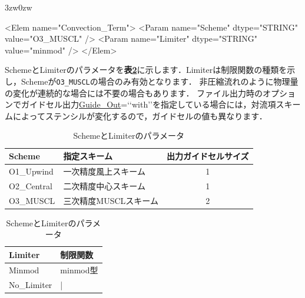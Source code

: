 \begin{indentation}{3zw}{0zw}

{\small
\begin{program}
<Elem name="Convection_Term">
  <Param name="Scheme"   dtype="STRING" value="O3_MUSCL" />
  <Param name="Limiter"  dtype="STRING" value="minmod" />
</Elem>
\end{program}
}

SchemeとLimiterのパラメータを\textbf{表\ref{tbl:scheme limiter}}に示します．Limiterは制限関数の種類を示し，Schemeが\verb|O3_MUSCL|の場合のみ有効となります．
非圧縮流れのように物理量の変化が連続的な場合には不要の場合もあります．
ファイル出力時のオプションでガイドセル出力\hyperlink{tgt:fileio}{Guide\_Out}=\lq\lq with\rq\rq を指定している場合には，対流項スキームによってステンシルが変化するので，ガイドセルの値も異なります．

\begin{table}[htdp]
\small
\caption{SchemeとLimiterのパラメータ}
\begin{minipage}{.6\textwidth}
\begin{center}
\begin{tabular}{llc} \toprule
Scheme & 指定スキーム & 出力ガイドセルサイズ\\ \midrule
O1\_Upwind & 一次精度風上スキーム & 1\\
O2\_Central & 二次精度中心スキーム & 1\\
O3\_MUSCL & 三次精度MUSCLスキーム & 2\\ \bottomrule
\end{tabular}
\end{center}
\end{minipage} \hfill
\begin{minipage}{.38\textwidth}
\begin{center}
\begin{tabular}{ll} \toprule
Limiter & 制限関数\\ \midrule
Minmod & minmod型\\
No\_Limiter & | \\ \bottomrule
\end{tabular}
\end{center}
\end{minipage}
\label{tbl:scheme limiter}
\end{table}

\end{indentation}



